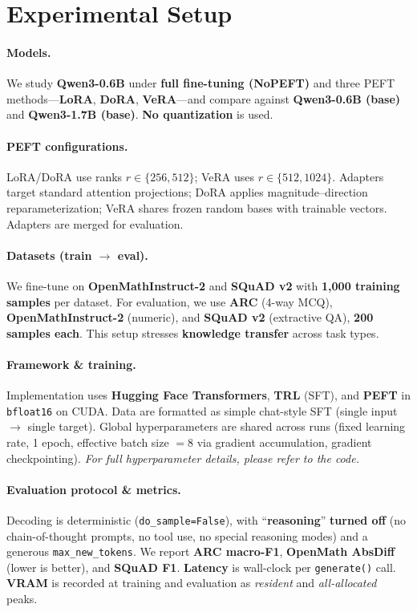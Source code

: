 \documentclass[11pt,a4paper]{article}
\begin{document}
\section{Experimental Setup}

\paragraph{Models.}
We study \textbf{Qwen3-0.6B}\cite{qwen} under \textbf{full fine-tuning (NoPEFT)} and three PEFT methods—\textbf{LoRA}, \textbf{DoRA}, \textbf{VeRA}—and compare against \textbf{Qwen3-0.6B (base)} and \textbf{Qwen3-1.7B (base)}. \textbf{No quantization} is used.

\paragraph{PEFT configurations.}
LoRA/DoRA use ranks $r\in\{256,512\}$; VeRA uses $r\in\{512,1024\}$. Adapters target standard attention projections; DoRA applies magnitude–direction reparameterization; VeRA shares frozen random bases with trainable vectors. Adapters are merged for evaluation.

\paragraph{Datasets (train $\rightarrow$ eval).}
We fine-tune on \textbf{OpenMathInstruct-2}\cite{openmath} and \textbf{SQuAD v2}\cite{squad} with \textbf{1{,}000 training samples} per dataset. For evaluation, we use \textbf{ARC}\cite{arc} (4-way MCQ), \textbf{OpenMathInstruct-2} (numeric), and \textbf{SQuAD v2} (extractive QA), \textbf{200 samples each}. This setup stresses \textbf{knowledge transfer} across task types.

\paragraph{Framework \& training.}
Implementation uses \textbf{Hugging Face Transformers}\cite{huggingfaceTransformers}, \textbf{TRL} (SFT), and \textbf{PEFT} in \texttt{bfloat16} on CUDA. Data are formatted as simple chat-style SFT (single input $\rightarrow$ single target). Global hyperparameters are shared across runs (fixed learning rate, 1 epoch, effective batch size $=8$ via gradient accumulation, gradient checkpointing). \textit{For full hyperparameter details, please refer to the code.}

\paragraph{Evaluation protocol \& metrics.}
Decoding is deterministic (\texttt{do\_sample=False}), with “\textbf{reasoning}” \textbf{turned off} (no chain-of-thought prompts, no tool use, no special reasoning modes) and a generous \texttt{max\_new\_tokens}. We report \textbf{ARC macro-F1}, \textbf{OpenMath AbsDiff} (lower is better), and \textbf{SQuAD F1}. \textbf{Latency} is wall-clock per \texttt{generate()} call. \textbf{VRAM} is recorded at training and evaluation as \emph{resident} and \emph{all-allocated} peaks.
\end{document}
